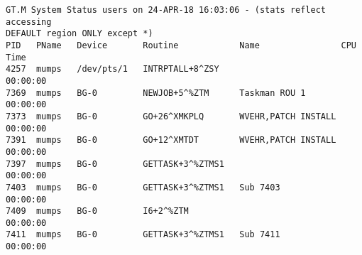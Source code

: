 \documentclass[]{article}
\begin{document}
\begin{lstlisting}
GT.M System Status users on 24-APR-18 16:03:06 - (stats reflect accessing 
DEFAULT region ONLY except *)
PID   PName   Device       Routine            Name                CPU Time
4257  mumps   /dev/pts/1   INTRPTALL+8^ZSY                        00:00:00
7369  mumps   BG-0         NEWJOB+5^%ZTM      Taskman ROU 1       00:00:00
7373  mumps   BG-0         GO+26^XMKPLQ       WVEHR,PATCH INSTALL 00:00:00
7391  mumps   BG-0         GO+12^XMTDT        WVEHR,PATCH INSTALL 00:00:00
7397  mumps   BG-0         GETTASK+3^%ZTMS1                       00:00:00
7403  mumps   BG-0         GETTASK+3^%ZTMS1   Sub 7403            00:00:00
7409  mumps   BG-0         I6+2^%ZTM                              00:00:00
7411  mumps   BG-0         GETTASK+3^%ZTMS1   Sub 7411            00:00:00
\end{lstlisting}
\end{document}
